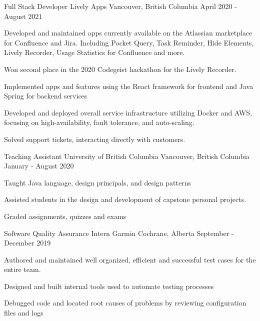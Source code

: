 \begin{cventries}
  \cventry
    {Full Stack Developer} %
    {Lively Apps} %
    {Vancouver, British Columbia} %
    {April 2020 - August 2021} %
    {
      \begin{cvitems} %
        \item {Developed and maintained apps currently available on the Atlassian marketplace for Confluence and Jira. Including Pocket Query, Task Reminder, Hide Elements, Lively Recorder, Usage Statistics for Confluence and more.}
        \item {Won second place in the 2020 Codegeist hackathon for the Lively Recorder.}
        \item {Implemented apps and features using the React framework for frontend and Java Spring for backend services}
        \item {Developed and deployed overall service infrastructure utilizing Docker and AWS, focusing on high-availability, fault tolerance, and auto-scaling.}
        \item {Solved support tickets, interacting directly with customers.}
      \end{cvitems}
    }


  \cventry
    {Teaching Assistant} %
    {University of British Columbia} %
    {Vancouver, British Columbia} %
    {January - August 2020} %
    {
      \begin{cvitems} %
        \item {Taught Java language, design principals, and design patterns}
        \item {Assisted students in the design and development of capstone personal projects.}
        \item {Graded assignments, quizzes and exams}
      \end{cvitems}
    }

  \cventry
    {Software Quality Assurance Intern} %
    {Garmin} %
    {Cochrane, Alberta} %
    {September - December 2019} %
    {
      \begin{cvitems} %
        \item {Authored and maintained well organized, efficient and successful test cases for the entire team.}
        \item {Designed and built internal tools used to automate testing processes}
        \item {Debugged code and located root causes of problems by reviewing configuration files and logs}
      \end{cvitems}
    }

\end{cventries}

